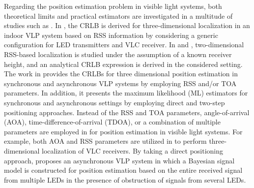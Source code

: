 \documentclass[10pt,twocolumn]{IEEEtran}
\begin{document}

Regarding the position estimation problem in visible light systems, both theoretical limits and practical estimators are investigated in a multitude of studies such as \cite{Direct_TCOM,Guvenc_hybrid,VLP_RSS_DP,Steendam_Aperture_JLT_2017,DMT_VLC,VLP_DP_ICASSP,
zhang2014asynchronous,VLP_OFDM,MultiPD_VLC_2016}. In \cite{Guvenc_hybrid}, the CRLB is derived for three-dimensional localization in an indoor VLP system based on RSS information by considering a generic configuration for LED transmitters and VLC receiver. In \cite{VLP_RSS_DP} and \cite{Steendam_Aperture_JLT_2017}, two-dimensional RSS-based localization is studied under the assumption of a known receiver height, and an analytical CRLB expression is derived in the considered setting. The work in \cite{Direct_TCOM} provides the CRLBs for three dimensional position estimation in synchronous and asynchronous VLP systems by employing RSS and/or TOA parameters. In addition, it presents the maximum likelihood (ML) estimators for synchronous and asynchronous settings by employing direct and two-step positioning approaches. Instead of the RSS and TOA parameters, angle-of-arrival (AOA), time-difference-of-arrival (TDOA), or a combination of multiple parameters are employed in \cite{Guvenc_hybrid,GuvencWAMI15,TDOA_VLC,ThreeD_AOARSS,VLP_latency,Ertan_TDOA_VLP} for position estimation in visible light systems. For example, both AOA and RSS parameters are utilized in \cite{Guvenc_hybrid} to perform three-dimensional localization of VLC receivers. By taking a direct positioning approach, \cite{VLP_DP_ICASSP} proposes an asynchronous VLP system in which a Bayesian signal model is constructed for position estimation based on the entire received signal from multiple LEDs in the presence of obstruction of signals from several LEDs.
\end{document}
